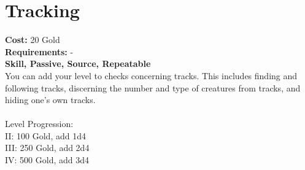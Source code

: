 \section{Tracking}
\textbf{Cost:} 20 Gold\\
\textbf{Requirements:} -\\
\textbf{Skill, Passive, Source, Repeatable}\\
You can add your level to checks concerning tracks. This includes finding and following tracks, discerning the number and type of creatures from tracks, and hiding one's own tracks.\\
\\
Level Progression:\\
II: 100 Gold, add 1d4\\
III: 250 Gold, add 2d4\\
IV: 500 Gold, add 3d4\\